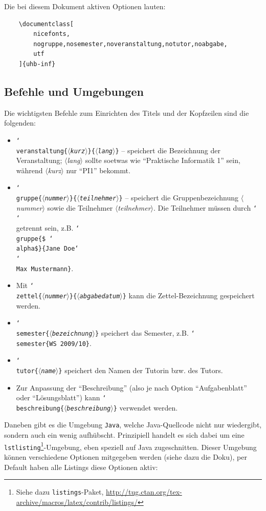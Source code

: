 \documentclass[nicefonts,nogruppe,nosemester,noveranstaltung,notutor,noabgabe,utf]{uhb-inf}
\begin{document}
Die bei diesem Dokument aktiven Optionen lauten:

\begin{verbatim}
    \documentclass[
        nicefonts,
        nogruppe,nosemester,noveranstaltung,notutor,noabgabe,
        utf
    ]{uhb-inf}
\end{verbatim}

\subsection{Befehle und Umgebungen}

Die wichtigsten Befehle zum Einrichten des Titels und der Kopfzeilen sind die folgenden:

\def\cs#1{\char`\\#1}
\def\p#1{$\langle$\textit{#1}$\rangle$}
\def\pb#1{\{\p{#1}\}}

\begin{itemize}
	\item \texttt{\cs{veranstaltung}\pb{kurz}\pb{lang}} -- speichert die Bezeichnung der Veranstaltung; \p{lang} sollte soetwas wie "`Praktische Informatik 1"' sein, während \p{kurz} nur "`PI1"' bekommt.
	\item \texttt{\cs{gruppe}\pb{nummer}\pb{teilnehmer}} -- speichert die Gruppenbezeichnung \p{nummer} sowie die Teilnehmer \p{teilnehmer}. Die Teilnehmer müssen durch \texttt{\cs\cs{}} getrennt sein, z.B. \texttt{\cs{gruppe}\{\$ \cs{alpha}\$\}\{Jane Doe\cs\cs{}Max Mustermann\}}.
	\item Mit \texttt{\cs{zettel}\pb{nummer}\pb{abgabedatum}} kann die Zettel-Bezeichnung gespeichert werden.
	\item \texttt{\cs{semester}\pb{bezeichnung}} speichert das Semester, z.B. \texttt{\cs{semester}\{WS 2009/10\}}.
	\item \texttt{\cs{tutor}\pb{name}} speichert den Namen der Tutorin bzw. des Tutors.
	\item Zur Anpassung der "`Beschreibung"' (also je nach Option "`Aufgabenblatt"' oder "`Lösungsblatt"') kann \texttt{\cs{beschreibung}\pb{beschreibung}} verwendet werden.
\end{itemize}

Daneben gibt es die Umgebung \texttt{Java}, welche Java-Quellcode nicht nur wiedergibt, sondern auch ein wenig aufhübscht. Prinzipiell handelt es sich dabei um eine \texttt{lstlisting}\footnote{Siehe dazu \texttt{listings}-Paket, \url{http://tug.ctan.org/tex-archive/macros/latex/contrib/listings/}}-Umgebung, eben speziell auf Java zugeschnitten. Dieser Umgebung können verschiedene Optionen mitgegeben werden (siehe dazu die Doku), per Default haben alle Listings diese Optionen aktiv:
\end{document}
